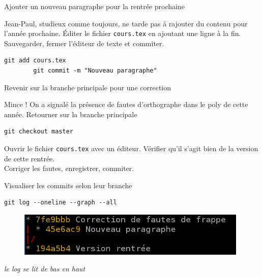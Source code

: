 \documentclass{beamer}
\begin{document}
\begin{frame}[fragile]{Ajouter un nouveau paragraphe pour la rentrée prochaine}

	Jean-Paul, studieux comme toujours, ne tarde pas à rajouter du contenu pour l'année prochaine.
	\vfill{}
	Éditer le fichier \texttt{cours.tex} en ajoutant une ligne à la fin. Sauvegarder, fermer l'éditeur de texte et commiter.	
	
	\begin{lstlisting}[frame=single]
		git add cours.tex
		git commit -m "Nouveau paragraphe"
	\end{lstlisting}
	
\end{frame}

\begin{frame}[fragile]{Revenir sur la branche principale pour une correction}

	Mince ! On a signalé la présence de fautes d'orthographe dans le poly de cette année.
	\vfill{}
	Retourner sur la branche principale	
	
	\begin{lstlisting}[frame=single]
		git checkout master
	\end{lstlisting}
	
	Ouvrir le fichier \texttt{cours.tex} avec un éditeur. Vérifier qu'il s'agit bien de la version de cette rentrée.\\
	Corriger les fautes, enregistrer, commiter.
	
\end{frame}

\begin{frame}[fragile]{Visualiser les commits selon leur branche}

	\begin{lstlisting}[frame=single]
		git log --oneline --graph --all
	\end{lstlisting}
	
	\begin{figure}
		\centering
		\includegraphics[width=11cm]{img/shot7}
	\end{figure}
	\begin{center}
	\textit{le log se lit de bas en haut}
	\end{center}
\end{frame}
\end{document}
